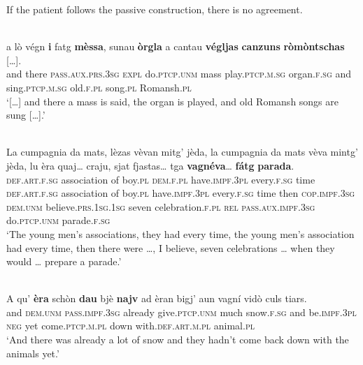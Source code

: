 If the patient follows the passive construction, there is no agreement.

\ea
\label{ex:pass.dyn4}
 {\citealt[94]{Büchli1966}}\\
\gll    [...] a lò végn \textbf{i} fatg \textbf{mèssa}, sunau \textbf{òrgla} a cantau \textbf{végljas} \textbf{canzuns} \textbf{ròmòntschas} […].\\
{} and there \textsc{pass.aux.prs.3sg} \textsc{expl} do.\textsc{ptcp.unm} mass play.\textsc{ptcp.m.sg} organ.\textsc{f.sg}  and sing.\textsc{ptcp.m.sg} old.\textsc{f.pl} song.\textsc{pl} Romansh.\textsc{pl}\\
\glt `[…] and there a mass is said, the organ is played, and old Romansh songs are sung […].'
\z

\ea
\label{ex:pass.dyn5}
\\
\gll    La cumpagnia da mats, lèzas vèvan mitg’ jèda, la cumpagnia da mats vèva mintg’ jèda, lu èra quaj… craju, sjat fjastas… tga \textbf{vagnéva}… \textbf{fátg} \textbf{parada}.\\
\textsc{def.art.f.sg} association of boy.\textsc{pl} \textsc{dem.f.pl} have.\textsc{impf.3pl} every.\textsc{f.sg} time \textsc{def.art.f.sg} association of boy.\textsc{pl} have.\textsc{impf.3pl} every.\textsc{f.sg} time then \textsc{cop.impf.3sg} \textsc{dem.unm} believe.\textsc{prs.1sg.1sg} seven celebration.\textsc{f.pl} \textsc{rel} \textsc{pass.aux.impf.3sg} do.\textsc{ptcp.unm} parade.\textsc{f.sg}\\
\glt `The young men's associations, they had every time, the young men's association had every time, then there were …, I believe, seven celebrations … when they would … prepare a parade.'
\z

\ea
\label{ex:pass.stat1}
\\
\gll A qu' \textbf{èra} schòn \textbf{dau} bjè \textbf{najv} ad èran bigj’ aun vagní vidò culs tiars.\\  
and \textsc{dem.unm} \textsc{pass.impf.3sg} already give.\textsc{ptcp.unm} much snow.\textsc{f.sg} and be.\textsc{impf.3pl} \textsc{neg} yet come.\textsc{ptcp.m.pl} down with.\textsc{def.art.m.pl} animal.\textsc{pl} \\
\glt `And there was already a lot of snow and they hadn’t come back down with the animals yet.'
\z

